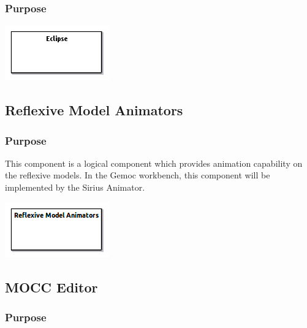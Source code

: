 \documentclass{gemoc} %
\begin{document}
\subsubsection{Purpose}

\begin{center}
\includegraphics*[trim=0.0cm 0.0cm 0cm 0.0cm, clip=true]{../images/generated/Generated_Eclipse.png}
\end{center}



\subsection{Reflexive Model Animators}


\subsubsection{Purpose}
This component is a logical component which provides animation capability on the reflexive models. In the Gemoc workbench, this component will be implemented by the Sirius Animator.
\begin{center}
\includegraphics*[trim=0.0cm 0.0cm 0cm 0.0cm, clip=true]{../images/generated/Generated_Reflexive_Model_Animators.png}
\end{center}



\subsection{MOCC Editor}


\subsubsection{Purpose}
\end{document}
